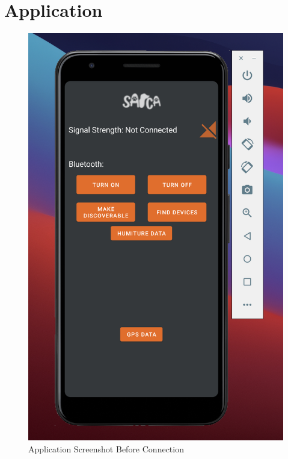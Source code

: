 \documentclass{ueacmpstyle}
\begin{document}
        \section{Application}\label{app:application}
            \begin{figure}[h]
                \centering
                \includegraphics[scale=0.75]{Images/App_photo_1.png}
                \caption{Application Screenshot Before Connection}
                \label{Figure App before connection}
            
            \end{figure}
            \clearpage
            
\end{document}

